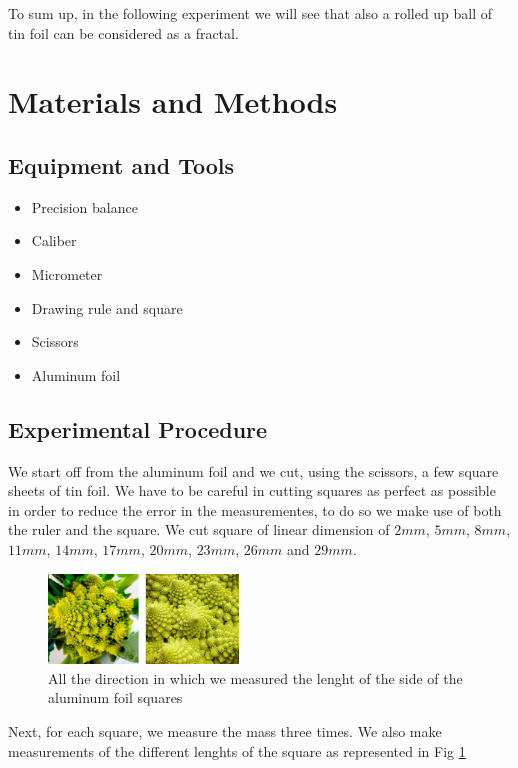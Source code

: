 \documentclass[a4paper,12pt]{article}
\begin{document}
To sum up, in the following experiment we will see that also a rolled up ball of 
tin foil can be considered as a fractal.


\section{Materials and Methods}
\subsection{Equipment and Tools}
\begin{itemize}
    \item Precision balance
    \item Caliber
    \item Micrometer
    \item Drawing rule and square
    \item Scissors
    \item Aluminum foil
\end{itemize}

\subsection{Experimental Procedure}
We start off from the aluminum foil and we cut, using the scissors, a few square sheets of tin foil. 
We have to be careful in cutting squares as perfect as possible in order to reduce the error in 
the measurementes, to do so we make use of both the ruler and the square. We cut square of linear 
dimension of $2mm$, $5mm$, $8mm$, $11mm$, $14mm$, $17mm$, $20mm$, $23mm$, $26mm$ and $29mm$.

\begin{figure}[h]
    \centering
    \includegraphics[width = 0.45\textwidth]{Cauliflower.jpg}
    \caption{All the direction in which we measured the lenght of the side of the aluminum foil squares}
    \label{fig:sq_measure}
\end{figure}

Next, for each square, we measure the mass three times. We also make measurements of the different 
lenghts of the square as represented in Fig \ref{fig:sq_measure} 
\end{document}
